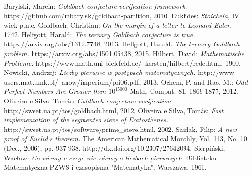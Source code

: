 \documentclass[10pt,onecolumn]{article}
\theoremstyle{definition}
\theoremstyle{hypothesis}
\theoremstyle{capability}
\begin{document}
\newpage


\begin{thebibliography}{9}

  Barylski, Marcin:
  \emph{Goldbach conjecture verification framework.}
  https://github.com/mbarylsk/goldbach-partition,
  2016.
  Euklides:
  \emph{Stoicheia},
  IV wiek p.n.e.
  Goldbach, Christian:
  \emph{On the margin of a letter to Leonard Euler},
  1742.
   Helfgott, Harald:
  \emph{The ternary Goldbach conjecture is true.}
  https://arxiv.org/abs/1312.7748,
  2013.
   Helfgott, Harald:
  \emph{The ternary Goldbach problem.}
  https://arxiv.org/abs/1501.05438,
  2015.
   Hilbert, David:
  \emph{Mathematische Probleme.}
  https://www.math.uni-bielefeld.de/~kersten/hilbert/rede.html,
  1900.
   Nowicki, Andrzej:
  \emph{Liczby pierwsze w postępach matematycznych.}
  http://www-users.mat.umk.pl/~anow/imperium/pri06.pdf,
  2013.
  Ochem, P. and Rao, M.:
  \emph{Odd Perfect Numbers Are Greater than $10^{15000}$}
   Math. Comput. 81, 1869-1877,
   2012.
   Oliveira e Silva, Tomás:
  \emph{Goldbach conjecture verification.}
  http://sweet.ua.pt/tos/goldbach.html,
  2012.
  Oliveira e Silva, Tomás:
  \emph{Fast implementation of the segmented sieve of Eratosthenes.}
  http://sweet.ua.pt/tos/software/prime\_sieve.html,
  2002.
  Saidak, Filip: 
  \emph{A new proof of Euclid's theorem.}
  The American Mathematical Monthly, Vol. 113, No. 10 (Dec., 2006), pp. 937-938. http://dx.doi.org/10.2307/27642094.
  Sierpiński, Wacław: 
  \emph{Co wiemy a czego nie wiemy o liczbach pierwszych.}
  Biblioteka Matematyczna PZWS i czasopisma "Matematyka". Warszawa, 1961.

\end{thebibliography}
\end{document}
